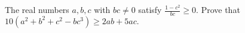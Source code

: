The real numbers  $a,b,c$  with  $bc\neq0$  satisfy $\frac{1-c^2}{bc}\geq0.$ Prove  that  $10(a^2+b^2+c^2-bc^3)\geq2ab+5ac.$